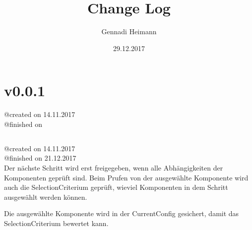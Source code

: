 \documentclass{article}
\begin{document}
\begin{titlepage}
\author{Gennadi Heimann}
\title{Change Log}
\date{29.12.2017}
\maketitle
\end{titlepage}

\section{v0.0.1}
@created on 14.11.2017\\
@finished on \\

\subsection{}
@created on     14.11.2017\\
@finished on   21.12.2017\\

Der n\"achste Schritt wird erst freigegeben, wenn alle Abh\"angigkeiten
der Komponenten gepr\"uft sind. Beim Prufen von der ausgew\"ahlte
Komponente wird auch die SelectionCriterium gepr\"uft, wieviel Komponenten
in dem Schritt ausgew\"ahlt werden k\"onnen.

Die ausgew\"ahlte Komponente wird in der CurrentConfig gesichert, damit das
SelectionCriterium bewertet kann.\\
\end{document}
